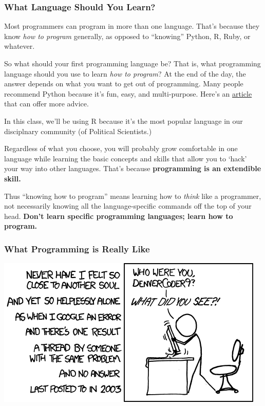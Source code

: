 \documentclass[]{book}
\begin{document}
\hypertarget{what-language-should-you-learn}{%
\subsubsection*{What Language Should You Learn?}\label{what-language-should-you-learn}}

Most programmers can program in more than one language. That's because they know \emph{how to program} generally, as opposed to ``knowing'' Python, R, Ruby, or whatever.

So what should your first programming language be? That is, what programming language should you use to learn \emph{how to program}? At the end of the day, the answer depends on what you want to get out of programming. Many people recommend Python because it's fun, easy, and multi-purpose. Here's an \href{http://lifehacker.com/which-programming-language-should-i-learn-first-1477153665}{article} that can offer more advice.

In this class, we'll be using R because it's the most popular language in our disciplnary community (of Political Scientists.)

Regardless of what you choose, you will probably grow comfortable in one language while learning the basic concepts and skills that allow you to `hack' your way into other languages. That's because \textbf{programming is an extendible skill.}

Thus ``knowing how to program'' means learning how to \emph{think} like a programmer, not necessarily knowing all the language-specific commands off the top of your head. \textbf{Don't learn specific programming languages; learn how to program.}

\hypertarget{what-programming-is-really-like}{%
\subsubsection*{What Programming is Really Like}\label{what-programming-is-really-like}}

\begin{center}\includegraphics[width=0.7\linewidth]{img/xkcd} \end{center}
\end{document}
